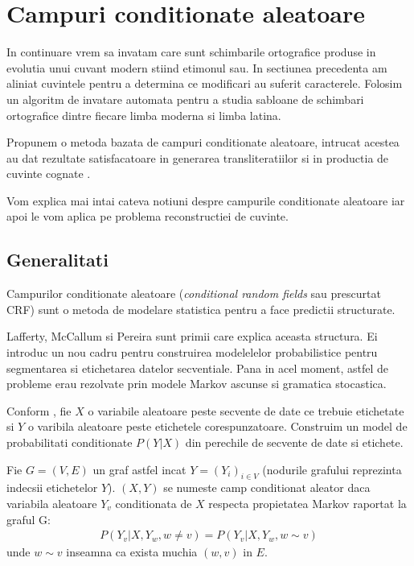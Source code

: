    
\section{Campuri conditionate aleatoare}
In continuare vrem sa invatam care sunt schimbarile ortografice produse in evolutia unui cuvant
modern stiind etimonul sau. In sectiunea precedenta am aliniat cuvintele pentru a determina ce 
modificari au suferit caracterele. Folosim un algoritm de invatare automata pentru a studia
sabloane de schimbari ortografice dintre fiecare limba moderna si limba latina.

Propunem o metoda bazata de campuri conditionate aleatoare, intrucat acestea au dat rezultate 
satisfacatoare in generarea transliteratiilor \cite{ganesh} si in productia de cuvinte cognate \cite{crfciobanu}.

Vom explica mai intai cateva notiuni despre campurile conditionate aleatoare iar apoi le vom aplica 
pe problema reconstructiei de cuvinte.

\subsection{Generalitati}
Campurilor conditionate aleatoare (\textit{conditional random fields} sau prescurtat CRF) sunt o
metoda de modelare statistica pentru a face predictii structurate.

Lafferty, McCallum si Pereira\cite{crf} sunt primii care explica aceasta structura. Ei introduc un 
nou cadru pentru construirea modelelelor probabilistice pentru segmentarea si etichetarea datelor
secventiale. Pana in acel moment, astfel de probleme erau rezolvate prin modele Markov ascunse si 
gramatica stocastica.

Conform \cite{crf}, fie $X$ o variabile aleatoare peste secvente de date ce trebuie etichetate si 
$Y$ o varibila aleatoare peste etichetele corespunzatoare. Construim un model de probabilitati
conditionate $P(Y|X)$ din perechile de secvente de date si etichete.

\begin{definition}
Fie $G=(V, E)$ un graf astfel incat $Y=(Y_i)_{i \in V}$ (nodurile grafului reprezinta
indecsii etichetelor $Y$). $(X, Y)$ se numeste camp conditionat aleator daca variabila aleatoare
$Y_v$ conditionata de $X$ respecta propietatea Markov raportat la graful G: 
  \begin{gather*}
    P(Y_v | X, Y_w, w \neq v) = P(Y_v | X, Y_w, w \sim v)
  \end{gather*}
unde $w \sim v$ inseamna ca exista muchia $(w, v)$ in $E$.
\end{definition}

